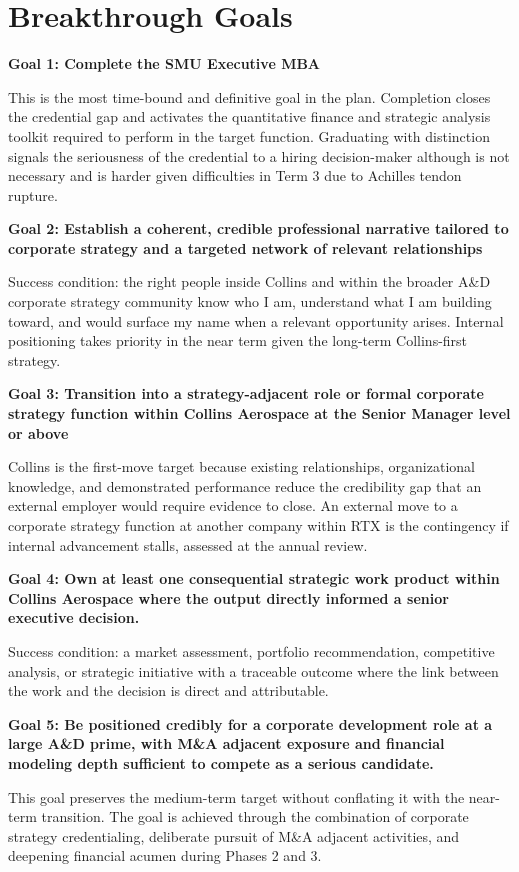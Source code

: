 \documentclass{article}
\begin{document}
\newpage

\section{Breakthrough Goals}

\textbf{Goal 1: Complete the SMU Executive MBA}

This is the most time-bound and definitive goal in the plan. Completion closes the credential gap and activates the
quantitative finance and strategic analysis toolkit required to perform in the target function. Graduating with distinction 
signals the seriousness of the credential to a hiring decision-maker although is not necessary and is harder given difficulties
in Term 3 due to Achilles tendon rupture.

\textbf{Goal 2: Establish a coherent, credible professional narrative tailored to corporate strategy and a targeted network
of relevant relationships} 

Success condition: the right people inside Collins and within the broader A\&D corporate strategy community know who I am, understand
what I am building toward, and would surface my name when a relevant opportunity arises. Internal positioning takes priority in the
near term given the long-term Collins-first strategy.

\textbf{Goal 3: Transition into a strategy-adjacent role or formal corporate strategy function within Collins Aerospace
at the Senior Manager level or above}

Collins is the first-move target because existing relationships, organizational knowledge, and demonstrated performance reduce the
credibility gap that an external employer would require evidence to close. An external move to a corporate strategy function at
another company within RTX is the contingency if internal advancement stalls, assessed at the annual review.

\textbf{Goal 4: Own at least one consequential strategic work product within Collins Aerospace where the output directly
informed a senior executive decision.}

Success condition: a market assessment, portfolio recommendation, competitive analysis, or strategic initiative with a traceable
outcome where the link between the work and the decision is direct and attributable.

\textbf{Goal 5: Be positioned credibly for a corporate development role at a large A\&D prime, with M\&A adjacent exposure
and financial modeling depth sufficient to compete as a serious candidate.}

This goal preserves the medium-term target without conflating it with the near-term transition. 
The goal is achieved through the combination of corporate strategy credentialing, deliberate pursuit of M\&A adjacent 
activities, and deepening financial acumen during Phases 2 and 3.
\end{document}
